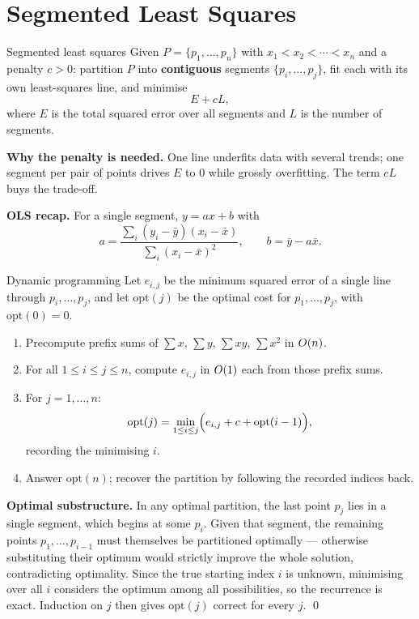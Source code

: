 \section{Segmented Least Squares}

\begin{prob}{Segmented least squares}
Given $P=\{p_1,\dots,p_n\}$ with $x_1<x_2<\cdots<x_n$ and a penalty $c>0$: partition $P$ into
\textbf{contiguous} segments $\{p_i,\dots,p_j\}$, fit each with its own least-squares line, and
minimise
\[
  E+cL,
\]
where $E$ is the total squared error over all segments and $L$ is the number of segments.
\end{prob}

\noindent\textbf{Why the penalty is needed.} One line underfits data with several trends; one
segment per pair of points drives $E$ to $0$ while grossly overfitting. The term $cL$ buys the
trade-off.

\noindent\textbf{OLS recap.} For a single segment, $y=ax+b$ with
\[
  a=\frac{\sum_i(y_i-\bar y)(x_i-\bar x)}{\sum_i(x_i-\bar x)^2},\qquad b=\bar y-a\bar x .
\]

\begin{algo}{Dynamic programming}
Let $e_{i,j}$ be the minimum squared error of a single line through $p_i,\dots,p_j$, and let
$\mathrm{opt}(j)$ be the optimal cost for $p_1,\dots,p_j$, with $\mathrm{opt}(0)=0$.
\begin{enumerate}
  \item Precompute prefix sums of $\sum x$, $\sum y$, $\sum xy$, $\sum x^2$ in $O(n)$.
  \item For all $1\le i\le j\le n$, compute $e_{i,j}$ in $O(1)$ each from those prefix sums.
  \item For $j=1,\dots,n$:
        \[
          \mathrm{opt}(j)=\min_{1\le i\le j}\Bigl(e_{i,j}+c+\mathrm{opt}(i-1)\Bigr),
        \]
        recording the minimising $i$.
  \item Answer $\mathrm{opt}(n)$; recover the partition by following the recorded indices back.
\end{enumerate}
\end{algo}

\begin{correct}
\textbf{Optimal substructure.} In any optimal partition, the last point $p_j$ lies in a single
segment, which begins at some $p_i$. Given that segment, the remaining points $p_1,\dots,p_{i-1}$
must themselves be partitioned optimally --- otherwise substituting their optimum would strictly
improve the whole solution, contradicting optimality. Since the true starting index $i$ is unknown,
minimising over all $i$ considers the optimum among all possibilities, so the recurrence is exact.
Induction on $j$ then gives $\mathrm{opt}(j)$ correct for every $j$. \qed
\end{correct}


